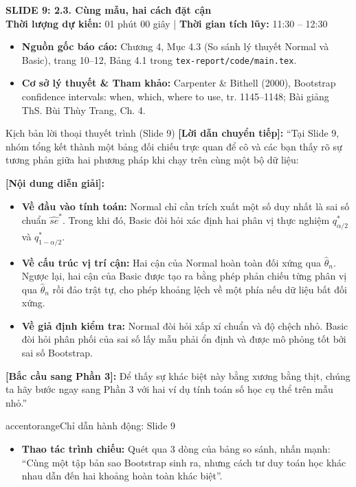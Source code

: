 \documentclass[10pt,a4paper]{article}
\newcommand{\slideheader}[4]{
    \vspace{0.4cm}
    \begin{tcolorbox}[colback=primary!7!white, colframe=primary, arc=2mm, boxrule=1pt, left=4mm, right=4mm, top=2.5mm, bottom=2.5mm]
        {\Large\bfseries\color{primary} SLIDE #1: #2}\\[0.1cm]
        {\small\textbf{Thời lượng dự kiến:} #3 \quad | \quad \textbf{Thời gian tích lũy:} #4}
    \end{tcolorbox}
    \vspace{0.15cm}
}
\begin{document}
\slideheader{9}{2.3. Cùng mẫu, hai cách đặt cận}{01 phút 00 giây}{11:30 -- 12:30}

\begin{itemize}
    \item \textbf{Nguồn gốc báo cáo:} Chương 4, Mục 4.3 (So sánh lý thuyết Normal và Basic), trang 10--12, Bảng 4.1 trong \texttt{tex-report/code/main.tex}.
    \item \textbf{Cơ sở lý thuyết \& Tham khảo:} Carpenter \& Bithell (2000), Bootstrap confidence intervals: when, which, where to use, tr. 1145--1148; Bài giảng ThS. Bùi Thùy Trang, Ch. 4.
\end{itemize}

\begin{scriptbox}{Kịch bản lời thoại thuyết trình (Slide 9)}
    \textbf{[Lời dẫn chuyển tiếp]:} ``Tại Slide 9, nhóm tổng kết thành một bảng đối chiếu trực quan để cô và các bạn thấy rõ sự tương phản giữa hai phương pháp khi chạy trên cùng một bộ dữ liệu:
    
    \textbf{[Nội dung diễn giải]:} 
    \begin{itemize}
        \item \textbf{Về đầu vào tính toán:} Normal chỉ cần trích xuất một số duy nhất là sai số chuẩn $\widehat{se}^*$. Trong khi đó, Basic đòi hỏi xác định hai phân vị thực nghiệm $q_{\alpha/2}^*$ và $q_{1-\alpha/2}^*$.
        \item \textbf{Về cấu trúc vị trí cận:} Hai cận của Normal hoàn toàn đối xứng qua $\hat\theta_n$. Ngược lại, hai cận của Basic được tạo ra bằng phép phản chiếu từng phân vị qua $\hat\theta_n$ rồi đảo trật tự, cho phép khoảng lệch về một phía nếu dữ liệu bất đối xứng.
        \item \textbf{Về giả định kiểm tra:} Normal đòi hỏi xấp xỉ chuẩn và độ chệch nhỏ. Basic đòi hỏi phân phối của sai số lấy mẫu phải ổn định và được mô phỏng tốt bởi sai số Bootstrap.
    \end{itemize}
    \textbf{[Bắc cầu sang Phần 3]:} Để thấy sự khác biệt này bằng xương bằng thịt, chúng ta hãy bước ngay sang Phần 3 với hai ví dụ tính toán số học cụ thể trên mẫu nhỏ.''
\end{scriptbox}

\begin{actionbox}{accentorange}{Chỉ dẫn hành động: Slide 9}
    \begin{itemize}
        \item \textbf{Thao tác trình chiếu:} Quét qua 3 dòng của bảng so sánh, nhấn mạnh: ``Cùng một tập bản sao Bootstrap sinh ra, nhưng cách tư duy toán học khác nhau dẫn đến hai khoảng hoàn toàn khác biệt''.
    \end{itemize}
\end{actionbox}
\end{document}
